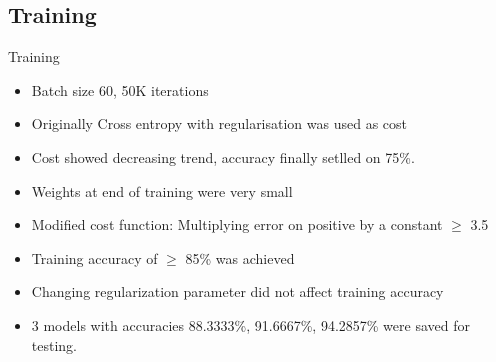 \documentclass{beamer}
\begin{document}
\subsection{Training}
\begin{frame}{Training}
  \begin{itemize}
    \item Batch size 60, 50K iterations
    \item Originally Cross entropy with regularisation was used as cost
    \item Cost showed decreasing trend, accuracy finally setlled on 75\%.
    \item Weights at end of training were very small
    \item Modified cost function: Multiplying error on positive by a constant $\geqslant$ 3.5
    \item Training accuracy of $\geqslant$ 85\% was achieved
    \item Changing regularization parameter did not affect training accuracy
    \item 3 models with accuracies  88.3333\%, 91.6667\%, 94.2857\% were saved for testing.
  \end{itemize}
\end{frame}
\end{document}
